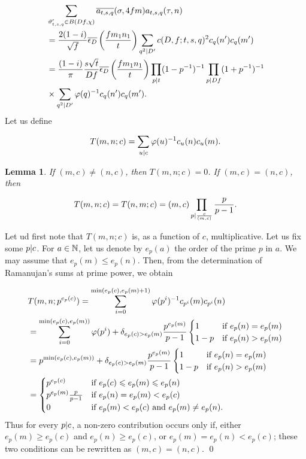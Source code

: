 \documentclass[leqno,10pt]{amsart}
\theoremstyle{plain}
\numberwithin{equation}{section}
\newtheorem{lemme}[thm]{Lemma}
\theoremstyle{definition}
\theoremstyle{remark}
\begin{document}
\begin{align}
&\sum_{\vartheta_{t,s,q}' \in B(Df,\chi)} \overline{a_{t,s,q}}(\sigma,4fm) a_{t,s,q}(\tau,n)\nonumber\\
&= \frac{2(1-i)}{\sqrt{f}} \overline{\epsilon_D} \left(\frac{fm_1n_1}{t}\right)
\sum_{q^2 \vert D'}c(D,f;t,s,q)^2 c_q(n') c_q(m')\nonumber \\
&= \frac{(1-i)}{\pi} \frac{s\sqrt{t}}{Df} \overline{\epsilon_D} \left(\frac{fm_1n_1}{t}\right) \prod_{p\vert t}(1-p^{-1})^{-1} \prod_{p\vert Df}(1+p^{-1})^{-1} \nonumber\\
& \times \sum_{q^2 \vert D'} \varphi(q)^{-1} c_q(n') c_q(m').\label{asymp:eq:thm:3}
\end{align}
Let us define 

\begin{equation}
T(m,n;c)= \sum_{u\vert c}\varphi(u)^{-1} c_u(n) c_u(m).
\end{equation}

\begin{lemme}\label{ram:lemme:2}
If $(m,c)\neq (n,c)$, then $T(m,n;c)=0$. If $(m,c)= (n,c)$, then 

\begin{gather*}
T(m,n;c) = T(n,m;c) =
(m,c)  \prod_{p\vert \frac{c}{(m,c)}} \frac{p}{p-1}. 
\end{gather*}
\end{lemme}

\proof
Let ud first note that $T(m,n;c)$ is, as a function of $c$, multiplicative. Let us fix some $p\vert c$. For $a\in \mathbb{N}$, let us denote by $e_p(a)$ the order of the prime $p$ in $a$. We may assume that $e_p(m)\leqslant e_p(n)$. Then, from the determination of Ramanujan's sums at prime power, we obtain

\begin{align*}
&T(m,n;p^{e_p(c)}) = \sum_{i=0}^{\min(e_p(c),e_p(m)+1)} \varphi(p^i)^{-1} c_{p^i}(m) c_{p^i}(n)\\
&= \sum_{i=0}^{\min(e_p(c),e_p(m))} \varphi(p^i)+\delta_{e_p(c)>e_p(m)}\frac{p^{e_p(m)}}{p-1} \begin{cases}
1& \textnormal{if }e_p(n)=e_p(m)\\
1-p& \textnormal{if }e_p(n)>e_p(m)
\end{cases}\\
&= p^{\min(e_p(c),e_p(m))} +\delta_{e_p(c)>e_p(m)}\frac{p^{e_p(m)}}{p-1} \begin{cases}
1& \textnormal{if }e_p(n)=e_p(m)\\
1-p& \textnormal{if }e_p(n)>e_p(m)
\end{cases}\\
&= \begin{cases} 
p^{e_p(c)}&\textnormal{if } e_p(c)\leqslant e_p(m)\leqslant e_p(n)\\
p^{e_p(m)} \frac{p}{p-1}
&\textnormal{if } e_p(n)=e_p(m)<e_p(c)\\
0&\textnormal{if }e_p(m)<e_p(c) \textnormal{ and } e_p(m)\neq e_p(n).\end{cases}
\end{align*}
Thus for every $p\vert c$, a non-zero contribution occurs only if, either $e_p(m)\geqslant e_p(c)$ and $e_p(n)\geqslant e_p(c)$, or $e_p(m)=e_p(n)< e_p(c)$; these two conditions can be rewritten as $(m,c)=(n,c)$.
\qed
\end{document}
